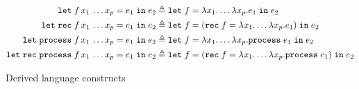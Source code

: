 \begin{figure*}[t]

\begin{small}
\begin{align*}
\mathtt{let}\; f\, x_1\, \ldots x_p = e_1 \;\mathtt{in}\; e_2
      \triangleq &\; \mathtt{let}\; f = \lambda x_1. \ldots \lambda x_p. e_1 \;\mathtt{in}\; e_2 \\
\mathtt{let}\; \mathtt{rec}\; f\, x_1\, \ldots x_p = e_1 \;\mathtt{in}\; e_2
      \triangleq &\; \mathtt{let}\; f =  (\mathtt{rec}\; f = \lambda x_1. \ldots \lambda x_p. e_1)  \;\mathtt{in}\; e_2 \\
\mathtt{let}\; \mathtt{process}\; f\, x_1\, \ldots x_p = e_1 \;\mathtt{in}\; e_2
      \triangleq &\; \mathtt{let}\; f = \lambda x_1. \ldots \lambda x_p.  \mathtt{process}\; e_1 \;\mathtt{in}\; e_2 \\     
\mathtt{let}\; \mathtt{rec}\; \mathtt{process}\; f\, x_1\, \ldots x_p = e_1 \;\mathtt{in}\; e_2
            \triangleq &\; \mathtt{let}\; f =  (\mathtt{rec}\; f = \lambda x_1. \ldots \lambda x_p. \mathtt{process}\; e_1)  \;\mathtt{in}\; e_2 
\end{align*}
\end{small}

\caption{Derived language constructs}
\label{fig:derived}
\end{figure*}
